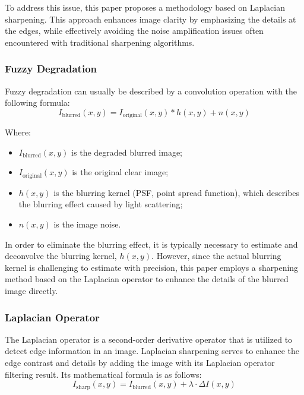 \documentclass[withoutpreface,bwprint]{cumcmthesis}
\begin{document}
To address this issue, this paper proposes a methodology based on Laplacian sharpening. This approach enhances image clarity by emphasizing the details at the edges, while effectively avoiding the noise amplification issues often encountered with traditional sharpening algorithms.

\subsubsection{Fuzzy Degradation}

Fuzzy degradation can usually be described by a convolution operation with the following formula:
\[I_{\text{blurred}}(x, y) = I_{\text{original}}(x, y) * h(x, y) + n(x, y)\]

Where:

\begin{itemize}[itemindent=2em]
    \item $I_{\text{blurred}}(x, y)$ is the degraded blurred image;

    \item $I_{\text{original}}(x, y)$ is the original clear image;

    \item $h(x, y)$ is the blurring kernel (PSF, point spread function), which describes the blurring effect caused by light scattering;

    \item $n(x, y)$ is the image noise.
\end{itemize}

In order to eliminate the blurring effect, it is typically necessary to estimate and deconvolve the blurring kernel, $h(x,y)$. However, since the actual blurring kernel is challenging to estimate with precision, this paper employs a sharpening method based on the Laplacian operator to enhance the details of the blurred image directly.

\subsubsection{Laplacian Operator}

The Laplacian operator is a second-order derivative operator that is utilized to detect edge information in an image. Laplacian sharpening serves to enhance the edge contrast and details by adding the image with its Laplacian operator filtering result. Its mathematical formula is as follows:
\[I_{\text{sharp}}(x, y) = I_{\text{blurred}}(x, y) + \lambda \cdot \Delta I(x, y)\]
\end{document}
